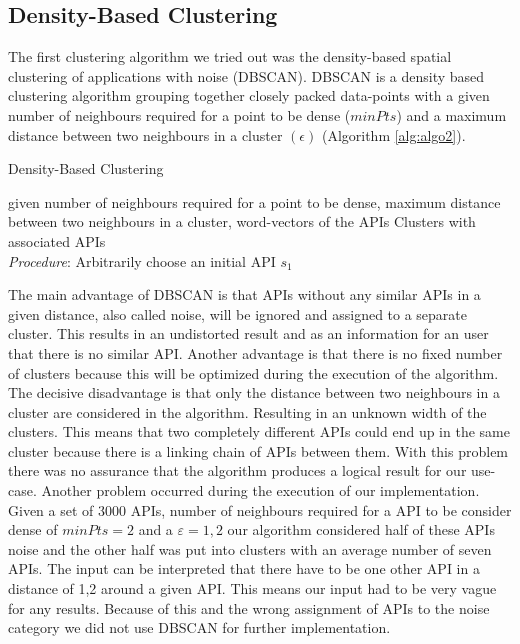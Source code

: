 \documentclass[a4paper]{IEEEtran}
\begin{document}
\subsection{Density-Based Clustering}
The first clustering algorithm we tried out was the density-based spatial clustering of applications with noise (DBSCAN). DBSCAN\cite{kanungo2002efficient} is a density based clustering algorithm grouping together closely packed data-points with a given number of neighbours required for a point to be dense ($minPts$) and a maximum distance between two neighbours in a cluster $(\epsilon)$ (Algorithm \ref{alg:algo2}). 

\begin{algorithm}[H]
 \caption{Density-Based Clustering}
 \label{alg:algo2}
 \begin{algorithmic}[1]
\renewcommand{\algorithmicrequire}{\textbf{Input:}}
 \renewcommand{\algorithmicensure}{\textbf{Output:}}
 \REQUIRE given number of neighbours required for a point to be dense, \newline maximum distance between two
neighbours in a cluster, \newline word-vectors of the APIs
 \ENSURE  Clusters with associated APIs
 \\ \textit{Procedure}:
  \STATE Arbitrarily choose an initial API $s_1$
 \STATE 

 \end{algorithmic}
 \end{algorithm}

The main advantage of DBSCAN is that APIs without any similar APIs in a given distance, also called noise, will be ignored and assigned to a separate cluster. This results in an undistorted result and as an information for an user that there is no similar API. 
Another advantage is that there is no fixed number of clusters because this will be optimized during the execution of the algorithm.
The decisive disadvantage is that only the distance between two neighbours in a cluster are considered in the algorithm. Resulting in an unknown width of the clusters. This means that two completely different APIs could end up in the same cluster because there is a linking chain of APIs between them. With this problem there was no assurance that the algorithm produces a logical result for our use-case.
Another problem occurred during the execution of our implementation. Given a set of 3000 APIs, number of neighbours required for a API to be consider dense of $minPts = 2$ and a $ε = 1,2$ our algorithm considered half of these APIs noise and the other half was put into clusters with an average number of seven APIs. The input can be interpreted that there have to be one other API in a distance of 1,2 around a given API. This means our input had to be very vague for any results. Because of this and the wrong assignment of APIs to the noise category we did not use DBSCAN for further implementation.
\end{document}
